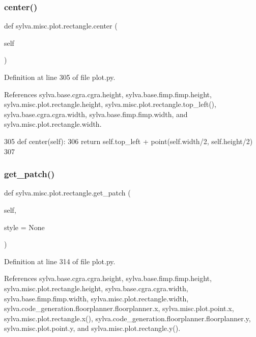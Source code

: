 \subsubsection{\texorpdfstring{center()}{center()}}
{\footnotesize\ttfamily def sylva.\+misc.\+plot.\+rectangle.\+center (\begin{DoxyParamCaption}\item[{}]{self }\end{DoxyParamCaption})}



Definition at line 305 of file plot.\+py.



References sylva.\+base.\+cgra.\+cgra.\+height, sylva.\+base.\+fimp.\+fimp.\+height, sylva.\+misc.\+plot.\+rectangle.\+height, sylva.\+misc.\+plot.\+rectangle.\+top\+\_\+left(), sylva.\+base.\+cgra.\+cgra.\+width, sylva.\+base.\+fimp.\+fimp.\+width, and sylva.\+misc.\+plot.\+rectangle.\+width.


\begin{DoxyCode}
305     \textcolor{keyword}{def }center(self):
306       \textcolor{keywordflow}{return} self.top\_left + point(self.width/2, self.height/2)
307 
\end{DoxyCode}
\mbox{\label{classsylva_1_1misc_1_1plot_1_1rectangle_af3defb54fedda1e1f8d886e5f840bb72}} 
\subsubsection{\texorpdfstring{get\+\_\+patch()}{get\_patch()}}
{\footnotesize\ttfamily def sylva.\+misc.\+plot.\+rectangle.\+get\+\_\+patch (\begin{DoxyParamCaption}\item[{}]{self,  }\item[{}]{style = {\ttfamily None} }\end{DoxyParamCaption})}



Definition at line 314 of file plot.\+py.



References sylva.\+base.\+cgra.\+cgra.\+height, sylva.\+base.\+fimp.\+fimp.\+height, sylva.\+misc.\+plot.\+rectangle.\+height, sylva.\+base.\+cgra.\+cgra.\+width, sylva.\+base.\+fimp.\+fimp.\+width, sylva.\+misc.\+plot.\+rectangle.\+width, sylva.\+code\+\_\+generation.\+floorplanner.\+floorplanner.\+x, sylva.\+misc.\+plot.\+point.\+x, sylva.\+misc.\+plot.\+rectangle.\+x(), sylva.\+code\+\_\+generation.\+floorplanner.\+floorplanner.\+y, sylva.\+misc.\+plot.\+point.\+y, and sylva.\+misc.\+plot.\+rectangle.\+y().


